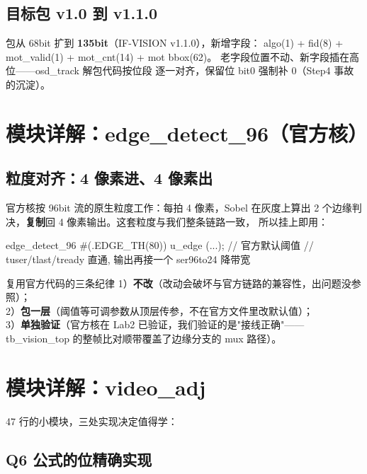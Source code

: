 \subsection{目标包 v1.0 到 v1.1.0}

包从 68bit 扩到 \textbf{135bit}（IF-VISION v1.1.0），新增字段：
algo(1) + fid(8) + mot\_valid(1) + mot\_cnt(14) + mot bbox(62)。
老字段位置不动、新字段插在高位——osd\_track 解包代码按位段
逐一对齐，保留位 bit0 强制补 0（Step4 事故的沉淀）。

\section{模块详解：edge\_detect\_96（官方核）}

\subsection{粒度对齐：4 像素进、4 像素出}

官方核按 96bit 流的原生粒度工作：每拍 4 像素，Sobel 在灰度上算出
2 个边缘判决，\textbf{复制}回 4 像素输出。这套粒度与我们整条链路一致，
所以挂上即用：

\begin{Verilog}
edge_detect_96 #(.EDGE_TH(80)) u_edge (...);   // 官方默认阈值
// tuser/tlast/tready 直通, 输出再接一个 ser96to24 降带宽
\end{Verilog}

\begin{keybox}{复用官方代码的三条纪律}
1）\textbf{不改}（改动会破坏与官方链路的兼容性，出问题没参照）；\\
2）\textbf{包一层}（阈值等可调参数从顶层传参，不在官方文件里改默认值）；\\
3）\textbf{单独验证}（官方核在 Lab2 已验证，我们验证的是"接线正确"——
tb\_vision\_top 的整帧比对顺带覆盖了边缘分支的 mux 路径）。
\end{keybox}

\section{模块详解：video\_adj}

47 行的小模块，三处实现决定值得学：

\subsection{Q6 公式的位精确实现}

